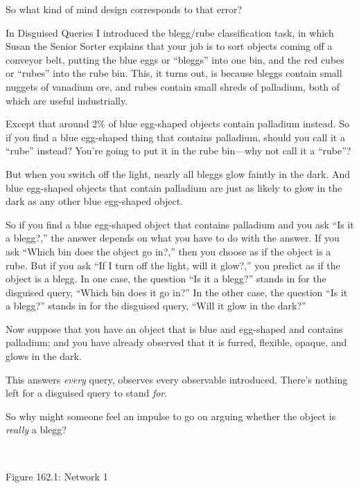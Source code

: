 {
 So what kind of mind design corresponds to that error?}

{
 In Disguised Queries I introduced the blegg/rube classification
task, in which Susan the Senior Sorter explains that your job is to
sort objects coming off a conveyor belt, putting the blue eggs or
``bleggs'' into one bin, and the red
cubes or ``rubes'' into the rube
bin. This, it turns out, is because bleggs contain small nuggets of
vanadium ore, and rubes contain small shreds of palladium, both of
which are useful industrially.}

{
 Except that around 2\% of blue egg-shaped objects contain
palladium instead. So if you find a blue egg-shaped thing that contains
palladium, should you call it a
``rube'' instead?
You're going to put it in the rube bin---why not call
it a ``rube''?}

{
 But when you switch off the light, nearly all bleggs glow faintly
in the dark. And blue egg-shaped objects that contain palladium are
just as likely to glow in the dark as any other blue egg-shaped
object.}

{
 So if you find a blue egg-shaped object that contains palladium
and you ask ``Is it a blegg?,'' the
answer depends on what you have to do with the answer. If you ask
``Which bin does the object go
in?,'' then you choose as if the object is a rube.
But if you ask ``If I turn off the light, will it
glow?,'' you predict as if the object is a blegg. In
one case, the question ``Is it a
blegg?'' stands in for the disguised query,
``Which bin does it go in?'' In the
other case, the question ``Is it a
blegg?'' stands in for the disguised query,
``Will it glow in the dark?''}

{
 Now suppose that you have an object that is blue and egg-shaped
and contains palladium; and you have already observed that it is
furred, flexible, opaque, and glows in the dark.}

{
 This answers \textit{every} query, observes every observable
introduced. There's nothing left for a disguised query
to stand \textit{for}.}

{
 So why might someone feel an impulse to go on arguing whether the
object is \textit{really} a blegg?}

{
 ~}

{\centering
{}
 \newline
 Figure 162.1: Network 1
\par}


\bigskip

